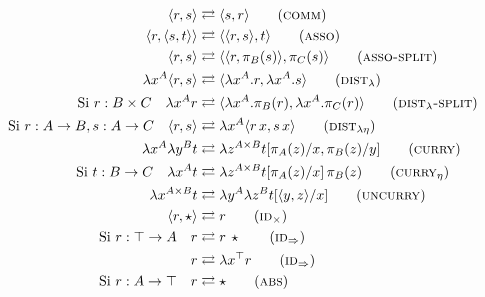 \begin{figure}[H]
	\centering
	\begin{align}
		\langle r,s \rangle &\rightleftarrows \langle s,r \rangle \tag{\textsc{comm}} \\
		\langle r, \langle s,t \rangle \rangle &\rightleftarrows \langle \langle r, s \rangle, t \rangle 	\tag{\textsc{asso}} \\
		\langle r, s \rangle &\rightleftarrows \langle \langle r, \pi_B (s) \rangle, \pi_C (s) \rangle 	\tag{\textsc{asso-split}} \\
		\lambda x^A \langle r,s \rangle &\rightleftarrows \langle \lambda x^A.r, \lambda x^A.s \rangle 	\tag{$\textsc{dist}_{\lambda}$} \\
		\text{Si } r: B \times C \quad \lambda x^A r &\rightleftarrows \langle \lambda x^A. \pi_B(r), \lambda x^A.\pi_C(r) \rangle \tag{$\textsc{dist}_{\lambda}\textsc{-split}$} \\
		\text{Si } r: A \rightarrow B, s : A \rightarrow C \quad \langle r,s \rangle &\rightleftarrows \lambda x^A \langle r \, x,s \, x \rangle \tag{$\textsc{dist}_{\lambda\eta}$} \\
		\lambda x^A \lambda y^B t &\rightleftarrows \lambda z^{A \times B} t[\pi_A(z)/x, \pi_B(z)/y]
		\tag{\textsc{curry}} \\
		\text{Si } t: B \rightarrow C \quad \lambda x^A t &\rightleftarrows \lambda z^{A \times B} t[\pi_A(z)/x]\, \pi_B(z) \tag{$\textsc{curry}_{\eta}$} \\
		\lambda x^{A \times B} t &\rightleftarrows \lambda y^A \lambda z^B t[\langle y, z \rangle/x] \tag{\textsc{uncurry}} \\
		\langle r, \star \rangle &\rightleftarrows r \tag{$\textsc{id}_\times$} \\
		\text{Si } r: \top \rightarrow A \quad r &\rightleftarrows r \, \star \tag{$\textsc{id}_\Rightarrow$} \\
		r &\rightleftarrows \lambda x^\top r \tag{$\textsc{id}_\Rightarrow$} \\
		\text{Si } r: A \rightarrow \top \quad r &\rightleftarrows \star \tag{\textsc{abs}}
	\end{align}
	

\end{figure}
